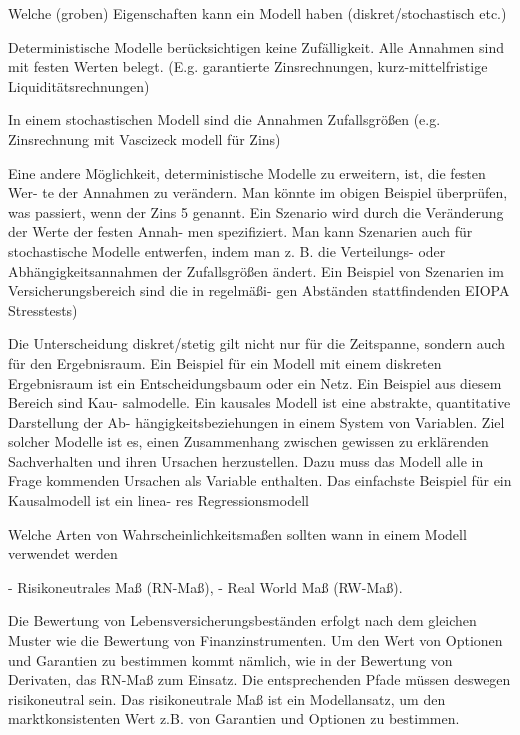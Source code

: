 Welche (groben) Eigenschaften kann ein Modell haben (diskret/stochastisch etc.)

Deterministische Modelle berücksichtigen keine Zufälligkeit. Alle Annahmen sind
mit festen Werten belegt. (E.g. garantierte Zinsrechnungen, kurz-mittelfristige Liquiditätsrechnungen)

In einem stochastischen Modell sind die Annahmen Zufallsgrößen (e.g. Zinsrechnung mit Vascizeck modell für Zins)

Eine andere Möglichkeit, deterministische Modelle zu erweitern, ist, die festen Wer-
te der Annahmen zu verändern. Man könnte im obigen Beispiel überprüfen, was
passiert, wenn der Zins 5%
genannt. Ein Szenario wird durch die Veränderung der Werte der festen Annah-
men spezifiziert. Man kann Szenarien auch für stochastische Modelle entwerfen,
indem man z. B. die Verteilungs- oder Abhängigkeitsannahmen der Zufallsgrößen
ändert. Ein Beispiel von Szenarien im Versicherungsbereich sind die in regelmäßi-
gen Abständen stattfindenden EIOPA Stresstests)

Die Unterscheidung diskret/stetig gilt nicht nur für die Zeitspanne, sondern auch für
den Ergebnisraum. Ein Beispiel für ein Modell mit einem diskreten Ergebnisraum ist
ein Entscheidungsbaum oder ein Netz. Ein Beispiel aus diesem Bereich sind Kau-
salmodelle. Ein kausales Modell ist eine abstrakte, quantitative Darstellung der Ab-
hängigkeitsbeziehungen in einem System von Variablen. Ziel solcher Modelle ist es,
einen Zusammenhang zwischen gewissen zu erklärenden Sachverhalten und ihren
Ursachen herzustellen. Dazu muss das Modell alle in Frage kommenden Ursachen
als Variable enthalten. Das einfachste Beispiel für ein Kausalmodell ist ein linea-
res Regressionsmodell



Welche Arten von Wahrscheinlichkeitsmaßen sollten wann in einem Modell verwendet werden

- Risikoneutrales Maß (RN-Maß),
- Real World Maß (RW-Maß).

Die Bewertung von Lebensversicherungsbeständen erfolgt nach dem gleichen Muster wie die Bewertung von Finanzinstrumenten. Um den Wert von Optionen und Garantien zu bestimmen kommt nämlich, wie in der Bewertung von Derivaten, das RN-Maß zum Einsatz. Die entsprechenden Pfade müssen deswegen risikoneutral
sein. Das risikoneutrale Maß ist ein Modellansatz, um den marktkonsistenten Wert
z.B. von Garantien und Optionen zu bestimmen.

